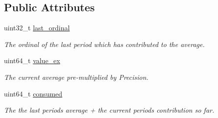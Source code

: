 \subsection*{Public Attributes}
\begin{DoxyCompactItemize}
\item 
\mbox{\label{structaacio_1_1chain_1_1resource__limits_1_1impl_1_1exponential__moving__average__accumulator_acf34fbb96d6303a07c2e422567364cb4}} 
uint32\+\_\+t \mbox{\hyperlink{structaacio_1_1chain_1_1resource__limits_1_1impl_1_1exponential__moving__average__accumulator_acf34fbb96d6303a07c2e422567364cb4}{last\+\_\+ordinal}}
\begin{DoxyCompactList}\small\item\em The ordinal of the last period which has contributed to the average. \end{DoxyCompactList}\item 
\mbox{\label{structaacio_1_1chain_1_1resource__limits_1_1impl_1_1exponential__moving__average__accumulator_a32a2778ebeabfef4b0aa3808f1cdec10}} 
uint64\+\_\+t \mbox{\hyperlink{structaacio_1_1chain_1_1resource__limits_1_1impl_1_1exponential__moving__average__accumulator_a32a2778ebeabfef4b0aa3808f1cdec10}{value\+\_\+ex}}
\begin{DoxyCompactList}\small\item\em The current average pre-\/multiplied by Precision. \end{DoxyCompactList}\item 
\mbox{\label{structaacio_1_1chain_1_1resource__limits_1_1impl_1_1exponential__moving__average__accumulator_a253323698c3c2805adfadfe478941983}} 
uint64\+\_\+t \mbox{\hyperlink{structaacio_1_1chain_1_1resource__limits_1_1impl_1_1exponential__moving__average__accumulator_a253323698c3c2805adfadfe478941983}{consumed}}
\begin{DoxyCompactList}\small\item\em The the last periods average + the current periods contribution so far. \end{DoxyCompactList}\end{DoxyCompactItemize}


